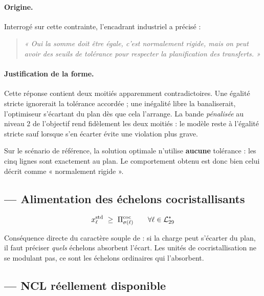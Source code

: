 \paragraph{Origine.} Interrogé sur cette contrainte, l'encadrant industriel a précisé :
\begin{quote}
\itshape « Oui la somme doit être égale, c'est normalement rigide, mais on peut avoir des
seuils de tolérance pour respecter la planification des transferts. »
\end{quote}

\paragraph{Justification de la forme.} Cette réponse contient deux moitiés apparemment
contradictoires. Une égalité stricte ignorerait la tolérance accordée ; une inégalité libre
la banaliserait, l'optimiseur s'écartant du plan dès que cela l'arrange. La bande
\emph{pénalisée} au niveau 2 de l'objectif rend fidèlement les deux moitiés : le modèle
reste à l'égalité stricte sauf lorsque s'en écarter évite une violation plus grave.

\begin{resultat}[title={Vérification empirique}]
Sur le scénario de référence, la solution optimale n'utilise \textbf{aucune} tolérance : les
cinq lignes sont exactement au plan. Le comportement obtenu est donc bien celui décrit comme
« normalement rigide ».
\end{resultat}

\subsection{ --- Alimentation des échelons cocristallisants}

\begin{equation}
x^{\mathrm{std}}_\ell \ \ge\ \Pi^{\mathrm{coc}}_{\sigma(\ell)} \qquad \forall \ell \in \mathcal{L}^{\ast}_{29}
\end{equation}

Conséquence directe du caractère souple de  : si la charge peut s'écarter du plan, il
faut préciser \emph{quels} échelons absorbent l'écart. Les unités de cocristallisation ne se
modulant pas, ce sont les échelons ordinaires qui l'absorbent.

\subsection{ --- NCL réellement disponible}


